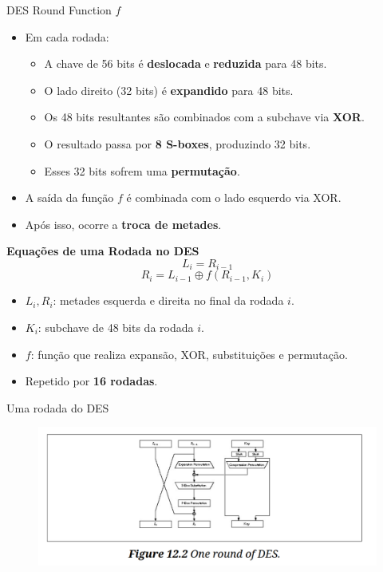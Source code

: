 \begin{frame}{DES Round Function $f$}
    \begin{itemize}
        \item Em cada rodada:
              \begin{itemize}
                  \item A chave de 56 bits é \textbf{deslocada} e \textbf{reduzida} para 48 bits.
                  \item O lado direito (32 bits) é \textbf{expandido} para 48 bits.
                  \item Os 48 bits resultantes são combinados com a subchave via \textbf{XOR}.
                  \item O resultado passa por \textbf{8 S-boxes}, produzindo 32 bits.
                  \item Esses 32 bits sofrem uma \textbf{permutação}.
              \end{itemize}
        \item A saída da função $f$ é combinada com o lado esquerdo via XOR.
        \item Após isso, ocorre a \textbf{troca de metades}.
    \end{itemize}
    \textbf{Equações de uma Rodada no DES}
    \[
        L_i = R_{i-1}
    \]
    \[
        R_i = L_{i-1} \oplus f(R_{i-1}, K_i)
    \]
    \begin{itemize}
        \item $L_i, R_i$: metades esquerda e direita no final da rodada $i$.
        \item $K_i$: subchave de 48 bits da rodada $i$.
        \item $f$: função que realiza expansão, XOR, substituições e permutação.
        \item Repetido por \textbf{16 rodadas}.
    \end{itemize}
\end{frame}

\begin{frame}{Uma rodada do DES}
    \begin{figure}
        \centering
        \includegraphics[width=\linewidth]{Figuras/one-round-des.png}

    \end{figure}

\end{frame}

